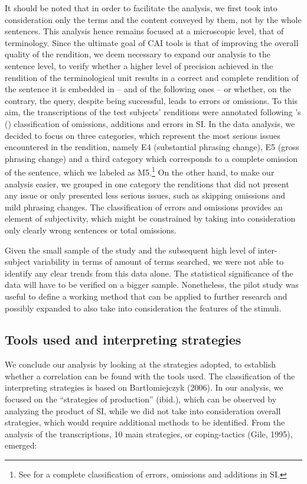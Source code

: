 \documentclass[output=paper]{langsci/langscibook}
\begin{document}
It should be noted that in order to facilitate the analysis, we first took into consideration only the terms and the content conveyed by them, not by the whole sentences. This analysis hence remains focused at a microscopic level, that of terminology. Since the ultimate goal of \textsc{CAI} tools is that of improving the overall quality of the rendition, we deem necessary to expand our analysis to the sentence level, to verify whether a higher level of precision achieved in the rendition of the terminological unit results in a correct and complete rendition of the sentence it is embedded in – and of the following ones – or whether, on the contrary, the query, despite being successful, leads to errors or omissions. To this aim, the transcriptions of the test subjects’ renditions were annotated following \citeauthor{Barik1971}’s (\citeyear{Barik1971}) classification of omissions, additions and errors in \textsc{SI}. In the data analysis, we decided to focus on three categories, which represent the most serious issues encountered in the rendition, namely E4 (substantial phrasing change), E5 (gross phrasing change) and a third category which corresponds to a complete omission of the sentence, which we labeled as M5.\footnote{See \citet{Barik1971} for a complete classification of errors, omissions and additions in \textsc{SI}.}  On the other hand, to make our analysis easier, we grouped in one category the renditions that did not present any issue or only presented less serious issues, such as skipping omissions and mild phrasing changes. The classification of errors and omissions provides an element of subjectivity, which might be constrained by taking into consideration only clearly wrong sentences or total omissions.

Given the small sample of the study and the subsequent high level of inter-subject variability in terms of amount of terms searched, we were not able to identify any clear trends from this data alone. The statistical significance of the data will have to be verified on a bigger sample. Nonetheless, the pilot study was useful to define a working method that can be applied to further research and possibly expanded to also take into consideration the features of the stimuli. 

\subsection{Tools used and interpreting strategies}\label{sec:prandi:5.3}
We conclude our analysis by looking at the strategies adopted, to establish whether a correlation can be found with the tools used. The classification of the interpreting strategies is based on Bartłomiejczyk (2006). In our analysis, we focused on the ``strategies of production'' (ibid.), which can be observed by analyzing the product of \textsc{SI}, while we did not take into consideration overall strategies, which would require additional methods to be identified. From the analysis of the transcriptions, 10 main strategies, or coping-tactics (Gile, 1995), emerged:
\end{document}
